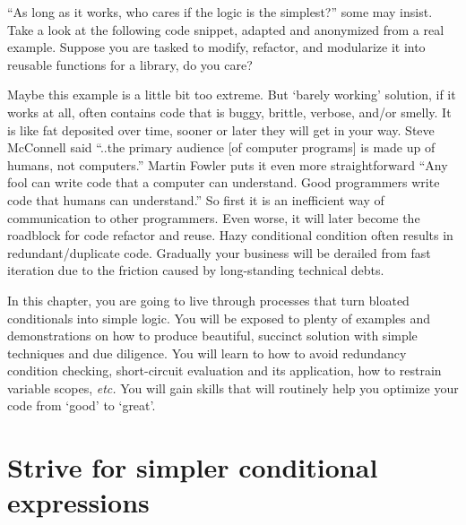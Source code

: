\documentclass[oneside,11pt]{book}
\theoremstyle{definition}
\theoremstyle{remark}
\begin{document}
``As long as it works, who cares if the logic is the simplest?'' some may insist.
Take a look at the following code snippet, adapted and anonymized from a real example.
Suppose you are tasked to modify, refactor, and modularize it into reusable functions for a library,
do you care?


Maybe this example is a little bit too extreme.
But `barely working' solution, if it works at all, often contains code that is buggy, brittle,
verbose, and/or smelly.
It is like fat deposited over time, sooner or later they will get in your way.
Steve McConnell said ``..the primary audience [of computer programs] is made up of humans,
not computers\cite{Mcconnell.2004}.''
Martin Fowler puts it even more straightforward
``Any fool can write code that a computer can understand.
Good programmers write code that humans can understand\cite{Fowler1999}.''
So first it is an inefficient way of communication to other programmers.
Even worse, it will later become the roadblock for code refactor and reuse.
Hazy conditional condition often results in redundant/duplicate code.
Gradually your business will be derailed from fast iteration due to the friction caused by
long-standing technical debts.

In this chapter, you are going to live through processes that turn bloated conditionals
into simple logic.
You will be exposed to plenty of examples and demonstrations on how to produce beautiful,
succinct solution with simple techniques and due diligence.
You will learn to how to avoid redundancy condition checking,
short-circuit evaluation and its application, how to restrain variable scopes, \textit{etc.}
You will gain skills that will routinely help you optimize your code from `good' to
`great'.






\section{Strive for simpler conditional expressions}\label{sec:logicEquivalences}
\end{document}
